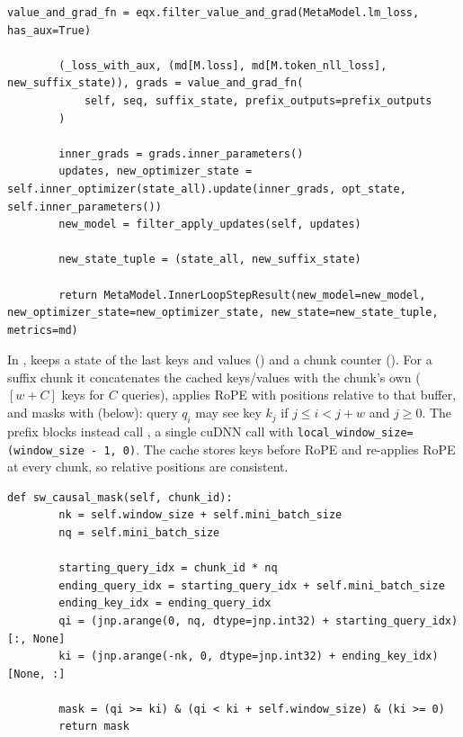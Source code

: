 \begin{lstlisting}[caption={Excerpt from \texttt{repos/\allowbreak{}test-time-training\_\_e2e/\allowbreak{}ttt/\allowbreak{}model/\allowbreak{}transformer.py} (\texttt{MetaModel.inner\_loop\_step})},label={lst:c09-e2e-step}]
        value_and_grad_fn = eqx.filter_value_and_grad(MetaModel.lm_loss, has_aux=True)

        (_loss_with_aux, (md[M.loss], md[M.token_nll_loss], new_suffix_state)), grads = value_and_grad_fn(
            self, seq, suffix_state, prefix_outputs=prefix_outputs
        )

        inner_grads = grads.inner_parameters()
        updates, new_optimizer_state = self.inner_optimizer(state_all).update(inner_grads, opt_state, self.inner_parameters())
        new_model = filter_apply_updates(self, updates)

        new_state_tuple = (state_all, new_suffix_state)

        return MetaModel.InnerLoopStepResult(new_model=new_model, new_optimizer_state=new_optimizer_state, new_state=new_state_tuple, metrics=md)
\end{lstlisting}

\begin{implnote}[title={In the code: sliding-window attention across chunks}]
In ,  keeps a state of the last
 keys and values () and a chunk counter
(). For a suffix chunk it concatenates the cached keys/values with the
chunk's own ($[w + C]$ keys for $C$ queries), applies RoPE with positions relative to that
buffer, and masks with  (below): query $q_i$ may see key $k_j$ if
$j \le i < j + w$ and $j \ge 0$. The prefix blocks instead call , a
single cuDNN call with \texttt{local\_window\_size=(window\_size - 1, 0)}. The cache stores keys
before RoPE and re-applies RoPE at every chunk, so relative positions are consistent.
\end{implnote}

\begin{lstlisting}[caption={Excerpt from \texttt{repos/\allowbreak{}test-time-training\_\_e2e/\allowbreak{}ttt/\allowbreak{}model/\allowbreak{}attention.py} (\texttt{SWA.sw\_causal\_mask})},label={lst:c09-e2e-mask}]
    def sw_causal_mask(self, chunk_id):
        nk = self.window_size + self.mini_batch_size
        nq = self.mini_batch_size

        starting_query_idx = chunk_id * nq
        ending_query_idx = starting_query_idx + self.mini_batch_size
        ending_key_idx = ending_query_idx
        qi = (jnp.arange(0, nq, dtype=jnp.int32) + starting_query_idx)[:, None]
        ki = (jnp.arange(-nk, 0, dtype=jnp.int32) + ending_key_idx)[None, :]

        mask = (qi >= ki) & (qi < ki + self.window_size) & (ki >= 0)
        return mask
\end{lstlisting}

